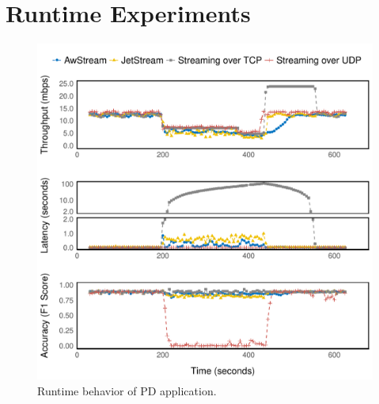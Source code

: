 \section{Runtime Experiments}

\begin{figure}
  \centering
  \includegraphics[width=\columnwidth]{figures/runtime-mot-verticle.pdf}
  \caption{Runtime behavior of PD application.}
  \label{fig:pd-runtime}
\end{figure}

